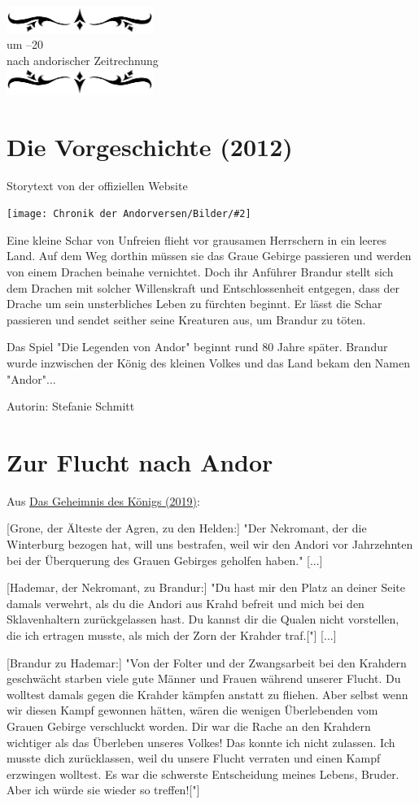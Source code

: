 \documentclass[10pt, a4paper, oneside]{book}
\newcommand{\fillbreak}{\vspace*{\fill}\columnbreak}
\newcommand{\storytext}[1]{%
    \section{#1}%
    \label{Storytext: #1}%
}
\newcommand{\refprodukt}[1]{\hyperref[Produkt: #1]{#1}}
\newcommand{\bildmitts}[2][height=0.32\textwidth,width=0.48\textwidth,keepaspectratio]{%
    \begin{center}
        \texttt{[image: Chronik der Andorversen/Bilder/\#2]}
    \end{center}
}
\newcommand{\az}[1]{%
    \begin{center}
        \includegraphics[width=180px]{Chronik der Andorversen/verzierung1.png}\\
        {\Huge #1} \\
        {nach andorischer Zeitrechnung}\\
        \includegraphics[width=180px]{Chronik der Andorversen/verzierung2.png}
    \end{center}
    \extramarks{}{#1 a.Z.}
}
\begin{document}
\begin{multicols}{2}
\fillbreak
\az{um –20}
\storytext{Die Vorgeschichte (2012)}

\begin{center}
    Storytext von der offiziellen Website
\end{center}

\bildmitts{Die Vorgeschichte Bild 1.jpg}

Eine kleine Schar von Unfreien flieht vor grausamen Herrschern in ein leeres Land. Auf dem Weg dorthin müssen sie das Graue Gebirge passieren und werden von einem Drachen beinahe vernichtet. Doch ihr Anführer Brandur stellt sich dem Drachen mit solcher Willenskraft und Entschlossenheit entgegen, dass der Drache um sein unsterbliches Leben zu fürchten beginnt. Er lässt die Schar passieren und sendet seither seine Kreaturen aus, um Brandur zu töten.

Das Spiel "Die Legenden von Andor" beginnt rund 80 Jahre später. Brandur wurde inzwischen der König des kleinen Volkes und das Land bekam den Namen "Andor"...\bigskip

Autorin: Stefanie Schmitt



\fillbreak
\section{Zur Flucht nach Andor}


\begin{center}
    Aus \refprodukt{Das Geheimnis des Königs (2019)}:
\end{center}

[Grone, der Älteste der Agren, zu den Helden:] "Der Nekromant, der die Winterburg bezogen hat, will uns bestrafen, weil wir den Andori vor Jahrzehnten bei der Überquerung des Grauen Gebirges geholfen haben." [...]

[Hademar, der Nekromant, zu Brandur:] "Du hast mir den Platz an deiner Seite damals verwehrt, als du die Andori aus Krahd befreit und mich bei den Sklavenhaltern zurückgelassen hast. Du kannst dir die Qualen nicht vorstellen, die ich ertragen musste, als mich der Zorn der Krahder traf.["] [...]

[Brandur zu Hademar:] "Von der Folter und der Zwangsarbeit bei den Krahdern geschwächt starben viele gute Männer und Frauen während unserer Flucht. Du wolltest damals gegen die Krahder kämpfen anstatt zu fliehen. Aber selbst wenn wir diesen Kampf gewonnen hätten, wären die wenigen Überlebenden vom Grauen Gebirge verschluckt worden. Dir war die Rache an den Krahdern wichtiger als das Überleben unseres Volkes! Das konnte ich nicht zulassen. Ich musste dich zurücklassen, weil du unsere Flucht verraten und einen Kampf erzwingen wolltest. Es war die schwerste Entscheidung meines Lebens, Bruder. Aber ich würde sie wieder so treffen!["]



\end{multicols}
\end{document}
